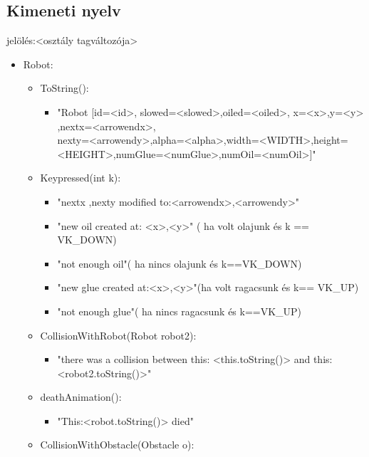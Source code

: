 \subsection{Kimeneti nyelv}

jelölés:<osztály tagváltozója>
\begin{itemize}
\item Robot: 
	\begin{itemize}
	\item ToString():
	        \begin{itemize}
	\item "Robot [id=<id>,  slowed=<slowed>,oiled=<oiled>, x=<x>,y=<y> \\,nextx=<arrowendx>,\\nexty=<arrowendy>,alpha=<alpha>,width=<WIDTH>,height=<HEIGHT>,numGlue=<numGlue>,numOil=<numOil>]" 
	        \end{itemize}
	\item Keypressed(int k):
	       \begin{itemize}
	        \item "nextx ,nexty modified to:<arrowendx>,<arrowendy>"
            \item "new oil created at: <x>,<y>" ( ha volt olajunk és k == VK\_DOWN)
            \item "not enough oil"( ha nincs olajunk és k==VK\_DOWN)
            \item "new glue created at:<x>,<y>"(ha volt ragacsunk és k== VK\_UP)
            \item "not enough glue"( ha nincs ragacsunk és k==VK\_UP)
        
	       \end{itemize}
	 \item CollisionWithRobot(Robot robot2):
	       	
	        \begin{itemize}
	        \item  "there was a collision between this: <this.toString()> and this: <robot2.toString()>"
	        
	        \end{itemize}
    \item deathAnimation():
	        \begin{itemize}
	        \item  "This:<robot.toString()> died"
	        
	        \end{itemize}
	 \item CollisionWithObstacle(Obstacle o):
	       	

\end{itemize}
\end{itemize}
